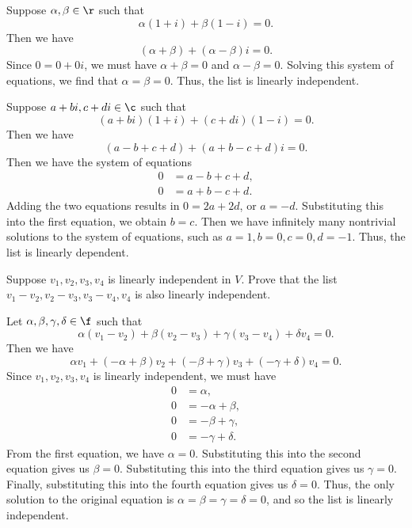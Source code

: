 \begin{sole}
    \item Suppose $\alpha, \beta \in \r$ such that
    \[\alpha(1 + i) + \beta(1 - i) = 0.\]
    Then we have
    \[(\alpha + \beta) + (\alpha - \beta)i = 0.\]
    Since $0 = 0 + 0i$, we must have $\alpha + \beta = 0$ and $\alpha - \beta = 0$. Solving this system of equations, we find that $\alpha = \beta = 0$. Thus, the list is linearly independent.
    \item Suppose $a + bi, c + di \in \c$ such that
    \[(a + bi)(1 + i) + (c + di)(1 - i) = 0.\]
    Then we have
    \[(a - b + c + d) + (a + b - c + d)i = 0.\]
    Then we have the system of equations
    \begin{align*}
        0 & = a - b + c + d, \\
        0 & = a + b - c + d.
    \end{align*}
    Adding the two equations results in $0 = 2a + 2d$, or $a = -d$. Substituting this into the first equation, we obtain $b = c$. Then we have infinitely many nontrivial solutions to the system of equations, such as $a = 1, b = 0, c = 0, d = -1$. Thus, the list is linearly dependent.
\end{sole}

\begin{exercise}[2a8]
    Suppose $v_1, v_2, v_3, v_4$ is linearly independent in $V$. Prove that the list
    \(v_1 - v_2, v_2 - v_3, v_3 - v_4, v_4\)
    is also linearly independent.
\end{exercise}

\begin{sol}
    Let $\alpha, \beta, \gamma, \delta \in \f$ such that
    \[\alpha(v_1 - v_2) + \beta(v_2 - v_3) + \gamma(v_3 - v_4) + \delta v_4 = 0.\]
    Then we have
    \[\alpha v_1 + (-\alpha + \beta)v_2 + (-\beta + \gamma)v_3 + (-\gamma + \delta)v_4 = 0.\]
    Since $v_1, v_2, v_3, v_4$ is linearly independent, we must have
    \begin{align*}
        0 & = \alpha, \\
        0 & = -\alpha + \beta, \\
        0 & = -\beta + \gamma, \\
        0 & = -\gamma + \delta.
    \end{align*}
    From the first equation, we have $\alpha = 0$. Substituting this into the second equation gives us $\beta = 0$. Substituting this into the third equation gives us $\gamma = 0$. Finally, substituting this into the fourth equation gives us $\delta = 0$. Thus, the only solution to the original equation is $\alpha = \beta = \gamma = \delta = 0$, and so the list is linearly independent.
\end{sol}
 
